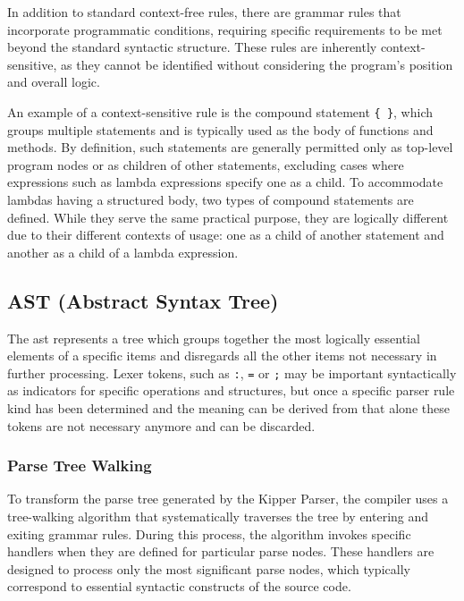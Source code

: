 In addition to standard context-free rules, there are grammar rules that incorporate programmatic conditions, requiring specific requirements to be met beyond the standard syntactic structure. These rules are inherently context-sensitive, as they cannot be identified without considering the program’s position and overall logic.

An example of a context-sensitive rule is the compound statement \lstinline|{ }|, which groups multiple statements and is typically used as the body of functions and methods. By definition, such statements are generally permitted only as top-level program nodes or as children of other statements, excluding cases where expressions such as lambda expressions specify one as a child. To accommodate lambdas having a structured body, two types of compound statements are defined. While they serve the same practical purpose, they are logically different due to their different contexts of usage: one as a child of another statement and another as a child of a lambda expression.

\subsection{AST (Abstract Syntax Tree)}
\label{sec:translation-to-the-ast}

The \acrshort{ast} represents a tree which groups together the most logically essential elements of a specific items and disregards all the other items not necessary in further processing. Lexer tokens, such as \lstinline|:|, \lstinline|=| or \lstinline|;| may be important syntactically as indicators for specific operations and structures, but once a specific parser rule kind has been determined and the meaning can be derived from that alone these tokens are not necessary anymore and can be discarded.

\subsubsection{Parse Tree Walking}

To transform the parse tree generated by the Kipper Parser, the compiler uses a tree-walking algorithm that systematically traverses the tree by entering and exiting grammar rules. During this process, the algorithm invokes specific handlers when they are defined for particular parse nodes. These handlers are designed to process only the most significant parse nodes, which typically correspond to essential syntactic constructs of the source code.


